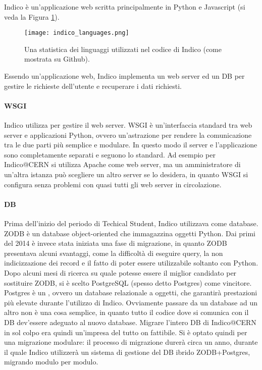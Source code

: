 		Indico è un'applicazione web scritta principalmente in Python e Javascript (si veda la Figura \ref{fig:indico_languages}).
		
		\begin{figure}[h!]
			\begin{center}
				\texttt{[image: indico\_languages.png]}
			\end{center}
			\caption[Linguaggi di Indico]{Una statistica dei linguaggi utilizzati nel codice di Indico (come mostrata su Github).}
			\label{fig:indico_languages}
		\end{figure}
		
		Essendo un'applicazione web, Indico implementa un web server ed un \ac{DB} per gestire le richieste dell'utente e recuperare i dati richiesti.
		
		\paragraph{WSGI}Indico utilizza  per gestire il web server. \ac{WSGI} è un'interfaccia standard tra web server e applicazioni Python, ovvero un'astrazione per rendere la comunicazione tra le due parti più semplice e modulare. In questo modo il server e  l'applicazione sono completamente separati e seguono lo standard. Ad esempio per Indico@CERN si utilizza Apache come web server, ma un amministratore di un'altra istanza può scegliere un altro server se lo desidera, in quanto \ac{WSGI} si configura senza problemi con quasi tutti gli web server in circolazione. \cite{indico:wsgi}
		
		\paragraph{DB}Prima dell'inizio del periodo di Techical Student, Indico utilizzava  come database. \ac{ZODB} è un database object-oriented che immagazzina oggetti Python. Dai primi del 2014 è invece stata iniziata una fase di migrazione, in  quanto \ac{ZODB} presentava alcuni svantaggi, come la difficoltà di eseguire query, la non indicizzazione dei record e il fatto di poter essere utilizzabile soltanto con Python. Dopo alcuni mesi di ricerca su quale potesse essere il miglior candidato per sostituire \ac{ZODB}, si è scelto PostgreSQL (spesso detto Postgres) come vincitore. Postgres è un , ovvero un database relazionale a oggetti, che garantirà prestazioni più elevate durante l'utilizzo di Indico. Ovviamente passare da un database ad un altro non è una cosa semplice, in quanto tutto il codice dove si comunica con il \ac{DB} dev'essere adeguato al nuovo database. Migrare l'intero \ac{DB} di Indico@CERN in sol colpo era quindi un'impresa del tutto on fattibile. Si è optato quindi per una migrazione modulare: il processo di migrazione durerà circa un anno, durante il quale Indico utilizzerà un sistema di gestione del \ac{DB} ibrido \ac{ZODB}+Postgres, migrando modulo per modulo. \cite{indico:zodb}\cite{pedro:chep}
		
